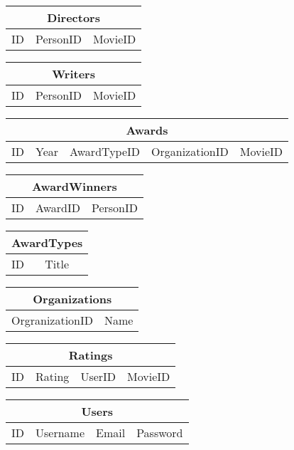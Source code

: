\noindent\begin{tabular}{|l|l|l|}
\hline
\multicolumn{3}{|c|}{Directors} \\ \hline
ID & PersonID & MovieID \\ \hline
\end{tabular}

\noindent\begin{tabular}{|l|l|l|}
\hline
\multicolumn{3}{|c|}{Writers} \\ \hline
ID & PersonID & MovieID\\ \hline
\end{tabular}

\noindent\begin{tabular}{|l|l|l|l|l|}
\hline
\multicolumn{5}{|c|}{Awards} \\ \hline
ID & Year & AwardTypeID & OrganizationID & MovieID \\ \hline
\end{tabular}

\noindent\begin{tabular}{|l|l|l|}
\hline
\multicolumn{3}{|c|}{AwardWinners} \\ \hline
ID & AwardID & PersonID \\ \hline
\end{tabular}

\noindent\begin{tabular}{|l|l|}
\hline
\multicolumn{2}{|c|}{AwardTypes} \\ \hline
ID & Title \\ \hline
\end{tabular}

\noindent\begin{tabular}{|l|l|}
\hline
\multicolumn{2}{|c|}{Organizations} \\ \hline
OrgranizationID & Name \\ \hline
\end{tabular}

\noindent\begin{tabular}{|l|l|l|l|}
\hline
\multicolumn{4}{|c|}{Ratings} \\ \hline
ID & Rating & UserID & MovieID \\ \hline
\end{tabular}

\noindent\begin{tabular}{|l|l|l|l|}
\hline
\multicolumn{4}{|c|}{Users} \\ \hline
ID & Username & Email & Password \\ \hline
\end{tabular}


